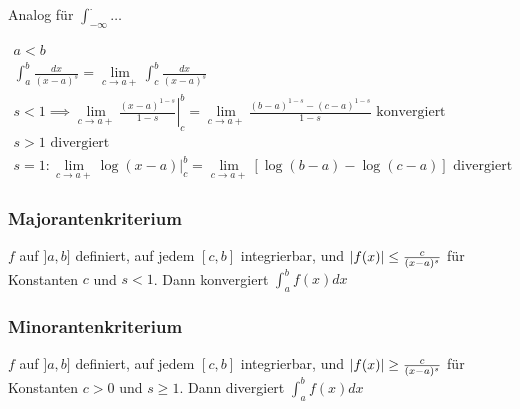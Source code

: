 Analog für $\int_{-\infty}^\cdot \dots$

\begin{bsp*}
	\begin{gather*}
		a < b \\
		\int_a^b \frac{dx}{(x-a)^s} = \lim_{c \rightarrow a+} \int_c^b \frac{dx}{(x-a)^s} \\
		s < 1 \implies \lim_{c \rightarrow a+} \left. \frac{(x-a)^{1-s}}{1-s} \right|_c^b =  \lim_{c \rightarrow a+} \frac{(b-a)^{1-s} - (c-a)^{1-s}}{1-s} \text{ konvergiert} \\
		s > 1 \text{ divergiert} \\
		s = 1 :  \lim_{c \rightarrow a+} \log(x-a)|_c^b =  \lim_{c \rightarrow a+} [\log(b-a) - \log(c-a)] \text{ divergiert}
	\end{gather*}
\end{bsp*}

\subsubsection{Majorantenkriterium}
$f$ auf $]a,b]$ definiert, auf jedem $[c,b]$ integrierbar, und $\abs{f(x)} \leq \frac{c}{(x-a)^s}$ für Konstanten $c$ und $s < 1$. Dann konvergiert $\int_a^b f(x) dx$

\subsubsection{Minorantenkriterium}
$f$ auf $]a,b]$ definiert, auf jedem $[c,b]$ integrierbar, und $\abs{f(x)} \geq \frac{c}{(x-a)^s}$ für Konstanten $c>0$ und $s \geq 1$. Dann divergiert $\int_a^b f(x) dx$

